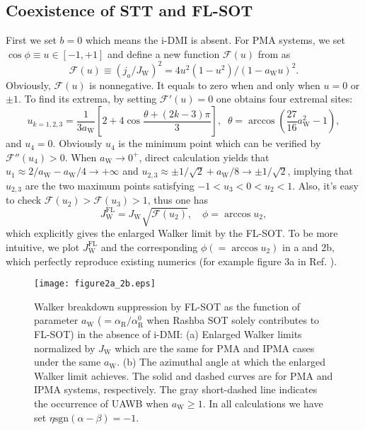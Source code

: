 \documentclass[12pt]{iopart}
\begin{document}
\subsection{Coexistence of STT and FL-SOT}\label{WalkerBreakdownSuppression:OnlyFLSOT}
First we set $b=0$ which means the i-DMI is absent.
For PMA systems, we set $\cos\phi\equiv u\in[-1,+1]$ and define a new function
$\mathcal{F}(u)$ from  as
\begin{equation}\label{F_u_only_FL_SOTs}
\mathcal{F}(u)\equiv\left(j_a/J_{\mathrm{W}}\right)^2 =4u^2(1-u^2)/(1-a_{\mathrm{W}}u)^2.
\end{equation}
Obviously, $\mathcal{F}(u)$ is nonnegative. It equals to zero when and only when $u=0$ or $\pm1$.
To find its extrema, by setting $\mathcal{F}'(u)=0$
one obtains four extremal sites:
\begin{equation}\label{dF_du_4roots_only_FL_SOTs}
u_{k=1,2,3}=\frac{1}{3a_{\mathrm{W}}}\left[2+4\cos\frac{\theta+(2k-3)\pi}{3}\right],\;\; \theta=\arccos\left(\frac{27}{16}a_{\mathrm{W}}^2-1\right),
\end{equation}
and $u_4=0$.
Obviously $u_4$ is the minimum point which can be verified by $\mathcal{F''}(u_4)>0$.
When $a_{\mathrm{W}}\rightarrow 0^+$, direct calculation yields that
$u_1\approx 2/a_{\mathrm{W}}-a_{\mathrm{W}}/4\rightarrow +\infty$ and
$u_{2,3}\approx \pm 1/\sqrt{2}+a_{\mathrm{W}}/8\rightarrow \pm 1/\sqrt{2}$,
implying that $u_{2,3}$ are the two maximum points satisfying $-1<u_3<0<u_2<1$.
Also, it's easy to check $\mathcal{F}(u_2)>\mathcal{F}(u_3)>1$,
thus one has
\begin{equation}\label{WB_only_FL_SOTs}
J_{\mathrm{W}}^{\mathrm{FL}}=J_{\mathrm{W}}\sqrt{\mathcal{F}(u_2)},\quad \phi=\arccos u_2,
\end{equation}
which explicitly gives the enlarged Walker limit by the FL-SOT.
To be more intuitive, we plot $J_{\mathrm{W}}^{\mathrm{FL}}$ and
the corresponding $\phi(=\arccos u_2)$ in a and 2b, which perfectly
reproduce existing numerics (for example figure 3a in Ref. \cite{Seo_JMMM_2012}).

\begin{figure}[htbp]
	\centering
	\texttt{[image: figure2a\_2b.eps]}
	\caption{Walker breakdown suppression by FL-SOT as the function of parameter 
		$a_{\mathrm{W}}$ ($=\alpha_{\mathrm{R}}/\alpha_{\mathrm{R}}^0$ when Rashba SOT solely contributes to FL-SOT)
		in the absence of i-DMI:
		(a) Enlarged Walker limits normalized by $J_{\mathrm{W}}$ which are the same for PMA and 
		IPMA cases under the same $a_{\mathrm{W}}$. 
		(b) The azimuthal angle at which the enlarged Walker limit achieves. The solid and dashed
		curves are for PMA and IPMA systems, respectively. The gray short-dashed line indicates the occurrence of UAWB
	    when $a_{\mathrm{W}} \ge 1$. In all calculations we have set $\eta\mathrm{sgn}(\alpha-\beta)=-1$.}\label{fig2}
\end{figure}
\end{document}
